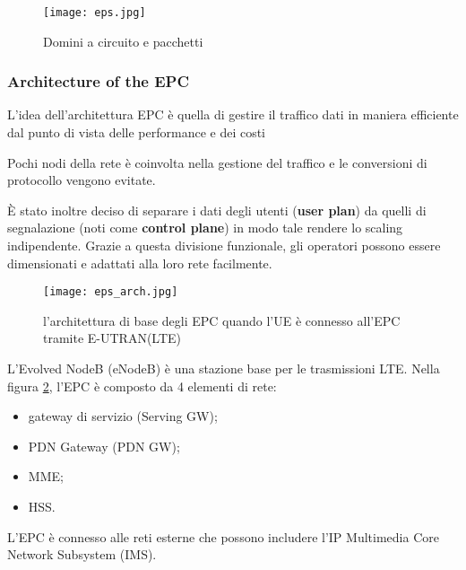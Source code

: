 \begin{figure}[H]
  \centering
  \texttt{[image: eps.jpg]}
  \caption{Domini a circuito e pacchetti}
  \label{fig:eps}
\end{figure}

\subsubsection{Architecture of the EPC}

L'idea dell'architettura EPC è quella di gestire il traffico dati in maniera
 efficiente dal punto di vista delle performance e dei costi

Pochi nodi della rete è coinvolta nella gestione del traffico e le conversioni
 di protocollo vengono evitate.

È stato inoltre deciso di separare i dati degli utenti (\textbf{user plan}) da quelli di segnalazione (noti come \textbf{control plane}) in modo tale rendere
 lo scaling indipendente.
Grazie a questa divisione funzionale, gli operatori possono essere
 dimensionati e adattati alla loro rete facilmente.

\begin{figure}[H]
  \centering
  \texttt{[image: eps\_arch.jpg]}
  \caption{l'architettura di base degli EPC quando l'UE è connesso all'EPC tramite E-UTRAN(LTE)}
  \label{fig:eps_arch}
\end{figure}

L'Evolved NodeB (eNodeB) è una stazione base per le trasmissioni LTE. Nella
 figura \ref{fig:eps_arch}, l'EPC è composto da 4 elementi di rete:
\begin{itemize}
  \item gateway di servizio (Serving GW);
  \item PDN Gateway (PDN GW);
  \item MME;
  \item HSS.
\end{itemize}

L'EPC è connesso alle reti esterne che possono includere l'IP Multimedia Core 
Network Subsystem (IMS).
